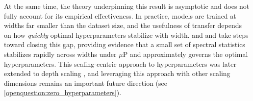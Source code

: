 At the same time, the theory underpinning this result is asymptotic and does not fully account for its empirical effectiveness.
In practice, models are trained at widths far smaller than the dataset size, and the usefulness of transfer depends on how \textit{quickly} optimal hyperparameters stabilize with width.
\citet{noci2024super} and \citet{ghosh2025understanding} and \citet{hayou2025proof} take steps toward closing this gap, providing evidence that a small set of spectral statistics stabilizes rapidly across widths under $\mu$P and approximately governs the optimal hyperparameters.
This scaling-centric approach to hyperparameters was later extended to depth scaling \citep{yang2023depth, bordelon2023depthwise, dey2025don}, and leveraging this approach with other scaling dimensions remains an important future direction (see \cref{openquestion:zero_hyperparameters}).
